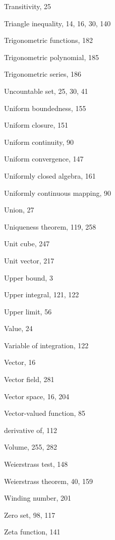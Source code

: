 \documentclass[10pt]{article}
\begin{document}
Transitivity, 25

Triangle inequality, 14, 16, 30, 140

Trigonometric functions, 182

Trigonometric polynomial, 185

Trigonometric series, 186

Uncountable set, 25, 30, 41

Uniform boundedness, 155

Uniform closure, 151

Uniform continuity, 90

Uniform convergence, 147

Uniformly closed algebra, 161

Uniformly continuous mapping, 90

Union, 27

Uniqueness theorem, 119, 258

Unit cube, 247

Unit vector, 217

Upper bound, 3

Upper integral, 121, 122

Upper limit, 56

Value, 24

Variable of integration, 122

Vector, 16

Vector field, 281

Vector space, 16, 204

Vector-valued function, 85

derivative of, 112

Volume, 255, 282

Weierstrass test, 148

Weierstrass theorem, 40, 159

Winding number, 201

Zero set, 98, 117

Zeta function, 141
\end{document}
